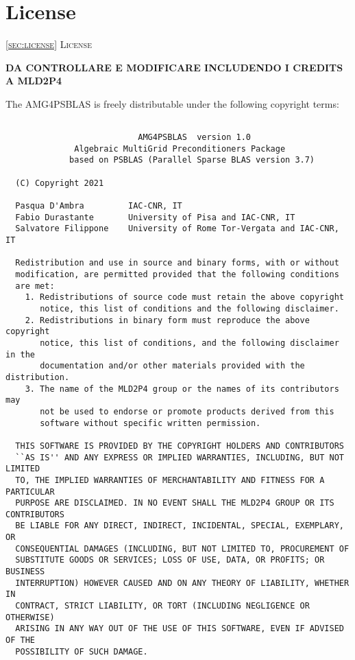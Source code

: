 \section{License\label{sec:license}}
         {\textsc{\ref{sec:license} License}}

{\bf DA CONTROLLARE E MODIFICARE INCLUDENDO I CREDITS A MLD2P4}

The AMG4PSBLAS is freely distributable under the following copyright
terms: {\small
\begin{verbatim}

                           AMG4PSBLAS  version 1.0
              Algebraic MultiGrid Preconditioners Package
             based on PSBLAS (Parallel Sparse BLAS version 3.7)

  (C) Copyright 2021

  Pasqua D'Ambra         IAC-CNR, IT
  Fabio Durastante       University of Pisa and IAC-CNR, IT
  Salvatore Filippone    University of Rome Tor-Vergata and IAC-CNR, IT

  Redistribution and use in source and binary forms, with or without
  modification, are permitted provided that the following conditions
  are met:
    1. Redistributions of source code must retain the above copyright
       notice, this list of conditions and the following disclaimer.
    2. Redistributions in binary form must reproduce the above copyright
       notice, this list of conditions, and the following disclaimer in the
       documentation and/or other materials provided with the distribution.
    3. The name of the MLD2P4 group or the names of its contributors may
       not be used to endorse or promote products derived from this
       software without specific written permission.

  THIS SOFTWARE IS PROVIDED BY THE COPYRIGHT HOLDERS AND CONTRIBUTORS
  ``AS IS'' AND ANY EXPRESS OR IMPLIED WARRANTIES, INCLUDING, BUT NOT LIMITED
  TO, THE IMPLIED WARRANTIES OF MERCHANTABILITY AND FITNESS FOR A PARTICULAR
  PURPOSE ARE DISCLAIMED. IN NO EVENT SHALL THE MLD2P4 GROUP OR ITS CONTRIBUTORS
  BE LIABLE FOR ANY DIRECT, INDIRECT, INCIDENTAL, SPECIAL, EXEMPLARY, OR
  CONSEQUENTIAL DAMAGES (INCLUDING, BUT NOT LIMITED TO, PROCUREMENT OF
  SUBSTITUTE GOODS OR SERVICES; LOSS OF USE, DATA, OR PROFITS; OR BUSINESS
  INTERRUPTION) HOWEVER CAUSED AND ON ANY THEORY OF LIABILITY, WHETHER IN
  CONTRACT, STRICT LIABILITY, OR TORT (INCLUDING NEGLIGENCE OR OTHERWISE)
  ARISING IN ANY WAY OUT OF THE USE OF THIS SOFTWARE, EVEN IF ADVISED OF THE
  POSSIBILITY OF SUCH DAMAGE.

\end{verbatim}
}
